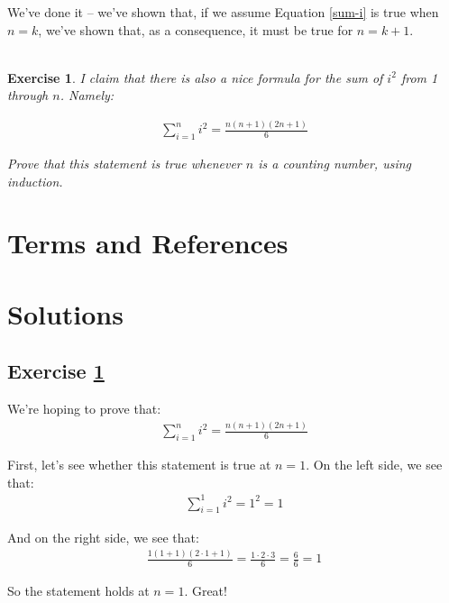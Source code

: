\documentclass{book}
\newtheorem{exercise}{\\ \bf Exercise}
\begin{document}
We've done it -- we've shown that, if we assume Equation \ref{sum-i} is true when $n=k$, we've shown that, as a consequence, it must be true for $n = k+1$. 


\begin{exercise}
\label{sum-i2}
I claim that there is also a nice formula for the sum of $i^2$ from 1 through $n$. Namely:

\begin{align*}
\sum_{i=1}^{n} i^2 = \frac{n(n+1)(2n+1)}{6}
\end{align*}

Prove that this statement is true whenever $n$ is a counting number, using induction.
\end{exercise}


\newpage
\section{Terms and References}

\section{Solutions}

\subsection{Exercise \ref{sum-i2}}


We're hoping to prove that:
\begin{align*}
\sum_{i=1}^{n} i^2 = \frac{n(n+1)(2n+1)}{6}
\end{align*}

First, let's see whether this statement is true at $n = 1$. On the left side, we see that:
\begin{align*}
\sum_{i=1}^{1} i^2 = 1^2 = 1
\end{align*}

And on the right side, we see that:
\begin{align*}
\frac{1(1+1)(2 \cdot 1+1)}{6} = \frac{1 \cdot 2 \cdot 3}{6} = \frac{6}{6} = 1
\end{align*}

So the statement holds at $n = 1$. Great!
\end{document}
